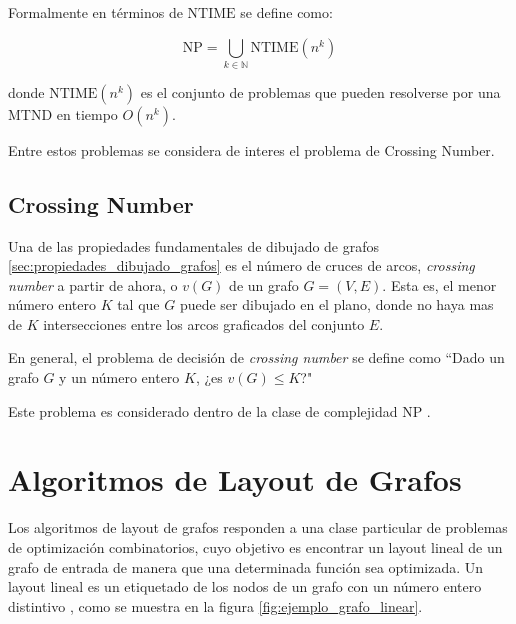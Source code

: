 Formalmente en términos de $\text{NTIME}$ se define como:

$$\text{NP} = \bigcup_{k \in  \mathbb{N}}^{}{\text{NTIME}(n^k)}$$

donde $\text{NTIME}(n^k)$ es el conjunto de problemas que pueden resolverse por una MTND en tiempo $O(n^k)$.

Entre estos problemas se considera de interes el problema de Crossing Number.

\subsection{Crossing Number}
\label{sec:crossing_number}
Una de las propiedades fundamentales de dibujado de grafos \ref{sec:propiedades_dibujado_grafos} es el número de cruces de arcos, \emph{crossing number} a partir de ahora, o $v(G)$ de un grafo $G=(V,E)$. Esta es, el menor número entero $K$ tal que $G$ puede ser dibujado en el plano, donde no haya mas de $K$ intersecciones entre los arcos graficados del conjunto $E$.

En general, el problema de decisión de \emph{crossing number} se define como ``Dado un grafo $G$ y un número entero $K$, ¿es $v(G) \leq K$?"

Este problema es considerado dentro de la clase de complejidad NP \cite{garey1983crossing}.

\section{Algoritmos de Layout de Grafos}
Los algoritmos de layout de grafos responden a una clase particular de problemas de optimización combinatorios, cuyo objetivo es encontrar un layout lineal de un grafo de entrada de manera que una determinada función sea optimizada. Un layout lineal es un etiquetado de los nodos de un grafo con un número entero distintivo \cite{diaz2002survey}, como se muestra en la figura \ref{fig:ejemplo_grafo_linear}.

